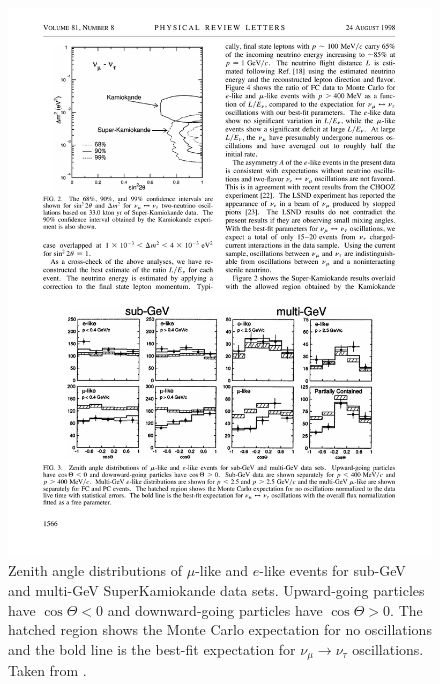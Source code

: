 \begin{figure}
  \centering
  \includegraphics{SuperKamiokandeDirection.pdf}
  \caption[Zenith angle distributions of $\mu$-like and $e$-like events for sub-GeV and multi-GeV SuperKamiokande data sets.]{Zenith angle distributions of $\mu$-like and $e$-like events for sub-GeV and multi-GeV SuperKamiokande data sets.  Upward-going particles have $\cos{\Theta} < 0$ and downward-going particles have $\cos{\Theta} > 0$.  The hatched region shows the Monte Carlo expectation for no oscillations and the bold line is the best-fit expectation for $\nu_{\mu}\rightarrow\nu_{\tau}$ oscillations.  Taken from \cite{SuperKamiokande1998}.}
  \label{fig:SuperKamiokandeDirection}
\end{figure}

